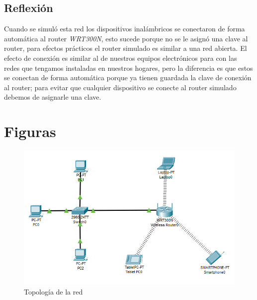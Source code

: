 \documentclass{article}
\begin{document}
        \subsection{Reflexión}
            
            Cuando se simuló esta red los dispositivos inalámbricos se conectaron de forma automática al router \emph{WRT300N}, esto sucede porque no se le asignó una clave al router, para efectos prácticos el router simulado es similar a una red abierta. El efecto de conexión es similar al de nuestros equipos electrónicos para con las redes que tengamos instaladas en nuestros hogares, pero la diferencia es que estos se conectan de forma automática porque ya tienen guardada la clave de conexión al router; para evitar que cualquier dispositivo se conecte al router simulado debemos de asignarle una clave.


    \clearpage
    
    
    
    \clearpage
    \appendix

    \section{Figuras}

        \begin{figure}[h!]
            \centering
            \includegraphics[scale=0.8]{img/network-topology.png}
            \caption{Topología de la red}
            \label{fig:network-topology}
        \end{figure}
\end{document}
